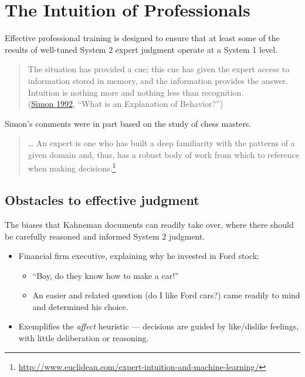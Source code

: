 \documentclass[
  10pt,
  b5paper]{book}
\providecommand{\tightlist}{%
  \setlength{\itemsep}{0pt}\setlength{\parskip}{0pt}}
\begin{document}
\hypertarget{the-intuition-of-professionals}{%
\section{The Intuition of Professionals}\label{the-intuition-of-professionals}}

Effective professional training is designed to ensure that at least some of the results of well-tuned System 2 expert judgment operate at a System 1 level.

\begin{quote}
The situation has provided a cue; this cue has given the expert access to information stored in memory, and the information provides the answer. Intuition is nothing more and nothing less than recognition.\\
(\protect\hyperlink{ref-simon1992explanation}{Simon 1992}, ``What is an Explanation of Behavior?'')
\end{quote}

Simon's comments were in part based on the study of chess masters.

\begin{quote}
\ldots{} An expert is one who has built a deep familiarity with the patterns of a given domain and, thus, has a robust body of work from which to reference when making decisions.\footnote{\url{http://www.euclidean.com/expert-intuition-and-machine-learning/}}
\end{quote}

\hypertarget{obstacles-to-effective-judgment}{%
\subsection*{Obstacles to effective judgment}\label{obstacles-to-effective-judgment}}

The biases that Kahneman documents can readily take over, where there should be carefully reasoned and informed System 2 judgment.

\begin{itemize}
\tightlist
\item
  Financial firm executive, explaining why he invested in Ford stock:

  \begin{itemize}
  \tightlist
  \item
    ``Boy, do they know how to make a car!''
  \item
    An easier and related question (do I like Ford cars?) came readily to mind and determined his choice.
  \end{itemize}
\item
  Exemplifies the \emph{affect} heuristic --- decisions are guided by like/dislike feelings, with little deliberation or reasoning.
\end{itemize}
\end{document}
